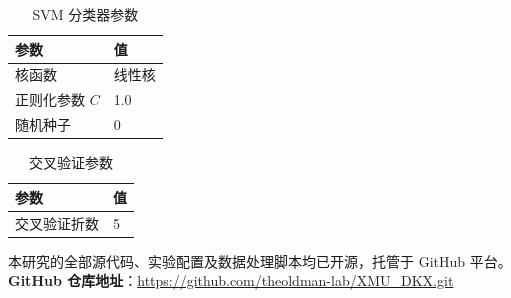 \begin{table}[H]
\centering
\caption{SVM 分类器参数}
\label{tab:svm_params}
\begin{tabular}{ll}
\hline
\textbf{参数} & \textbf{值} \\
\hline
核函数 & 线性核 \\
正则化参数 $C$ & 1.0 \\
随机种子 & 0 \\
\hline
\end{tabular}
\end{table}

\begin{table}[H]
\centering
\caption{交叉验证参数}
\label{tab:cv_params}
\begin{tabular}{ll}
\hline
\textbf{参数} & \textbf{值} \\
\hline
交叉验证折数 & 5 \\
\hline
\end{tabular}
\end{table}

\label{sec:source_code}

本研究的全部源代码、实验配置及数据处理脚本均已开源，托管于 GitHub 平台。\textbf{GitHub 仓库地址}：\url{https://github.com/theoldman-lab/XMU_DKX.git}


